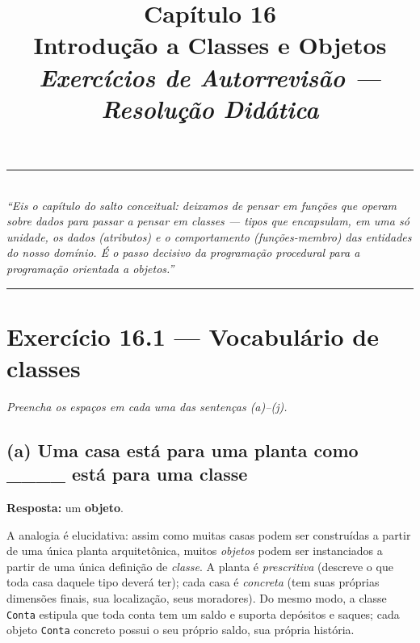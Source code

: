 \documentclass[11pt,a4paper]{article}
\title{
  \vspace{-1cm}
  {\Huge\bfseries\color{deitelblue} Cap\'itulo 16}\\[0.3em]
  {\Large\bfseries Introdu\c{c}\~ao a Classes e Objetos}\\[0.8em]
  {\large\itshape Exerc\'icios de Autorrevis\~ao --- Resolu\c{c}\~ao Did\'atica}
}
\author{}
\date{}
\begin{document}
\maketitle
\thispagestyle{empty}
\vspace{-2em}

\begin{center}
\rule{0.85\textwidth}{0.5pt}\\[0.4em]
\textit{``Eis o cap\'itulo do salto conceitual: deixamos de pensar em \emph{fun\c{c}\~oes que operam sobre dados} para passar a pensar em \emph{classes} --- tipos que encapsulam, em uma s\'o unidade, os dados (atributos) e o comportamento (fun\c{c}\~oes-membro) das entidades do nosso dom\'inio. \'E o passo decisivo da programa\c{c}\~ao procedural para a programa\c{c}\~ao orientada a objetos.''}\\[0.4em]
\rule{0.85\textwidth}{0.5pt}
\end{center}

\vspace{1em}

\section{Exerc\'icio 16.1 --- Vocabul\'ario de classes}

\textit{Preencha os espa\c{c}os em cada uma das senten\c{c}as (a)--(j).}

\subsection*{(a) Uma casa est\'a para uma planta como ____ est\'a para uma classe}

\begin{resposta}\textbf{Resposta:} um \textbf{objeto}.\end{resposta}

A analogia \'e elucidativa: assim como muitas casas podem ser constru\'idas a partir de uma \'unica planta arquitet\^onica, muitos \emph{objetos} podem ser instanciados a partir de uma \'unica defini\c{c}\~ao de \emph{classe}. A planta \'e \emph{prescritiva} (descreve o que toda casa daquele tipo dever\'a ter); cada casa \'e \emph{concreta} (tem suas pr\'oprias dimens\~oes finais, sua localiza\c{c}\~ao, seus moradores). Do mesmo modo, a classe \texttt{Conta} estipula que toda conta tem um saldo e suporta dep\'ositos e saques; cada objeto \texttt{Conta} concreto possui o seu pr\'oprio saldo, sua pr\'opria hist\'oria.
\end{document}
